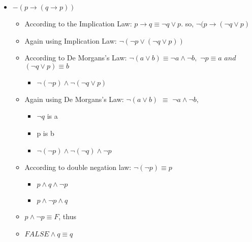 \documentclass[11pt]{article}
\begin{document}
\begin{itemize}
\item $-(p \to (q \to p))$

 \begin{itemize}
\item According to the Implication Law: $p \to q \equiv \neg q \vee p $. so, $ \neg (p \to (\neg q \vee p) $
\item Again using Implication Law: $ \neg ( \neg p \vee (\neg q \vee p))$
\item According to De Morgans's Law: $\neg (a \vee b) \equiv \neg a \wedge \neg b,$  $\neg p \equiv  a $ $ and $ $(\neg q \vee p) \equiv b $ 
\begin{itemize}
\item $ \neg( \neg p) \wedge \neg ( \neg q \vee p)$
\end{itemize}
\item Again using De Morgans's Law: $\neg (a \vee b)$ $ \equiv $ $\neg a \wedge \neg b,$
\begin{itemize}
\item $\neg q $ is a 
\item p is b 
\item $ \neg (\neg p) \wedge \neg(\neg q) \wedge \neg p$
\end{itemize}
\item According to double negation law: $\neg (\neg p ) \equiv p $ 
\begin{itemize}
\item $p \wedge q \wedge \neg p $
\item $p \wedge \neg p \wedge q $
\end{itemize}
\item $p \wedge \neg p \equiv F $, thus 
\item $FALSE \wedge q  \equiv q $
\end{itemize}
\end{itemize}
\end{document}
